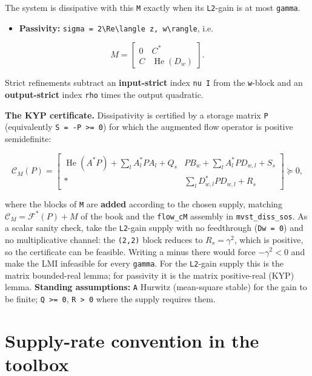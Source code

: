 \documentclass[11pt,oneside]{report}
\newcommand{\code}[1]{\texttt{#1}}
\providecommand{\tightlist}{\setlength{\itemsep}{0pt}\setlength{\parskip}{0pt}}
\begin{document}
The system is dissipative with this \code{M} exactly when its \code{L2}-gain is at most
\code{gamma}.

\begin{itemize}
\tightlist
\item
  \textbf{Passivity:} \code{sigma = 2\textbackslash{}Re\textbackslash{}langle z, w\textbackslash{}rangle}, i.e.
\end{itemize}

\[
M = \begin{bmatrix} 0 & C^{*} \\ C & \operatorname{He}(D_w) \end{bmatrix}.
\]

Strict refinements subtract an \textbf{input-strict} index \code{nu I} from the
\code{w}-block and an \textbf{output-strict} index \code{rho} times the output quadratic.

\textbf{The KYP certificate.} Dissipativity is certified by a storage matrix \code{P}
(equivalently \code{S = -P \textgreater{}= 0}) for which the augmented flow operator is positive
semidefinite:

\[
\mathcal{C}_M(P) =
\begin{bmatrix}
  \operatorname{He}(A^{*}P) + \sum_l A_l^{*}P A_l + Q_s &
  P B_w + \sum_l A_l^{*}P D_{w,l} + S_s \\[2pt]
  \ast & \sum_l D_{w,l}^{*}P D_{w,l} + R_s
\end{bmatrix} \succeq 0 ,
\]

where the blocks of \code{M} are \textbf{added} according to the chosen supply, matching
\(\mathcal{C}_M = \mathcal{F}^{*}(P) + M\) of the book and the \code{flow\_cM} assembly
in \code{mvst\_diss\_sos}. As a scalar sanity check, take the \code{L2}-gain supply with no
feedthrough (\code{Dw = 0}) and no multiplicative channel: the \code{(2,2)} block reduces
to \(R_s = \gamma^2\), which is positive, so the certificate can be feasible.
Writing a minus there would force \(-\gamma^2 < 0\) and make the LMI infeasible
for every \code{gamma}. For the \code{L2}-gain supply this is the matrix bounded-real
lemma; for passivity it is the matrix positive-real (KYP) lemma. \textbf{Standing
assumptions:} \code{A} Hurwitz
(mean-square stable) for the gain to be finite; \code{Q \textgreater{}= 0}, \code{R \textgreater{} 0} where the
supply requires them.

\hypertarget{supply-rate-convention-in-the-toolbox}{%
\section{Supply-rate convention in the toolbox}\label{supply-rate-convention-in-the-toolbox}}
\end{document}
